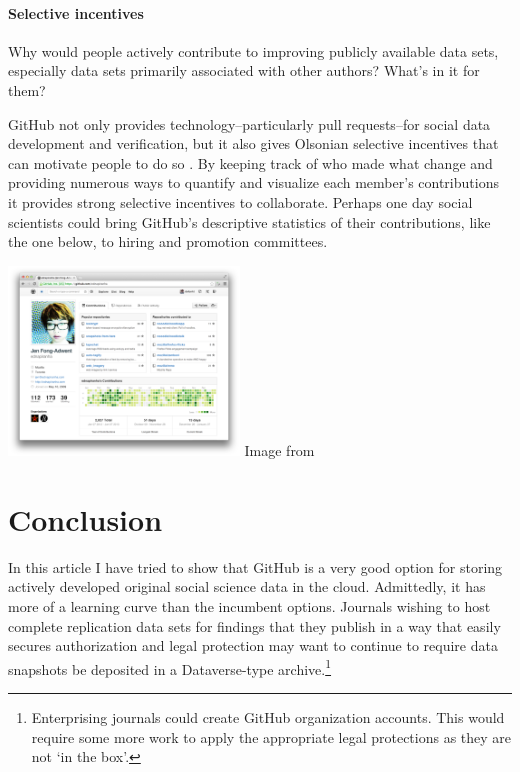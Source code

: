 \documentclass[twocolumn]{article}\usepackage{graphicx, color}
\begin{document}
\paragraph{Selective incentives}

Why would people actively contribute to improving publicly available data sets, especially data sets primarily associated with other authors? What's in it for them? 

GitHub not only provides technology--particularly pull requests--for social data development and verification, but it also gives Olsonian selective incentives that can motivate people to do so \citep{Olson1965}. By keeping track of who made what change and providing numerous ways to quantify and visualize each member's contributions it provides strong selective incentives to collaborate. Perhaps one day social scientists could bring GitHub's descriptive statistics of their contributions, like the one below, to hiring and promotion committees.   

\begin{center}
    \includegraphics[width=0.46\textwidth]{images/Contributors.png}
    {\tiny{Image from \cite{Palmer2013}}}
\end{center}

\section{Conclusion}

In this article I have tried to show that GitHub is a very good option for storing actively developed original social science data in the cloud. Admittedly, it has more of a learning curve than the incumbent options. Journals wishing to host complete replication data sets for findings that they publish in a way that easily secures authorization and legal protection may want to continue to require data snapshots be deposited in a Dataverse-type archive.\footnote{Enterprising journals could create GitHub organization accounts. This would require some more work to apply the appropriate legal protections as they are not `in the box'.}
\end{document}
